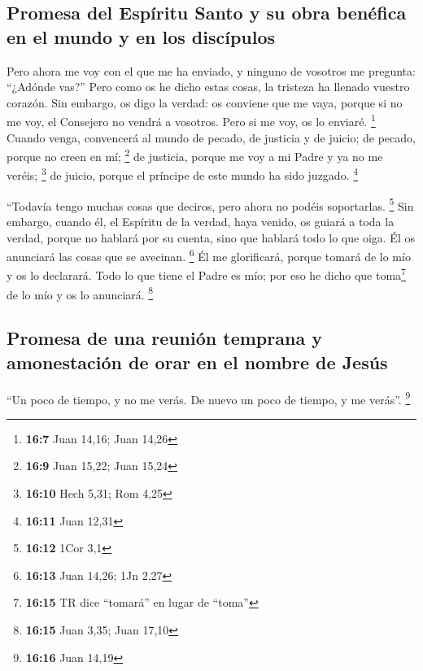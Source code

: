 \hypertarget{promesa-del-espuxedritu-santo-y-su-obra-benuxe9fica-en-el-mundo-y-en-los-discuxedpulos}{%
\subsection{Promesa del Espíritu Santo y su obra benéfica en el mundo y
en los
discípulos}\label{promesa-del-espuxedritu-santo-y-su-obra-benuxe9fica-en-el-mundo-y-en-los-discuxedpulos}}

 Pero ahora me voy con el que me ha enviado, y ninguno de
vosotros me pregunta: ``¿Adónde vas?''  Pero como os he
dicho estas cosas, la tristeza ha llenado vuestro corazón.
 Sin embargo, os digo la verdad: os conviene que me vaya,
porque si no me voy, el Consejero no vendrá a vosotros. Pero si me voy,
os lo enviaré. \footnote{\textbf{16:7} Juan 14,16; Juan 14,26}
 Cuando venga, convencerá al mundo de pecado, de justicia
y de juicio;  de pecado, porque no creen en mí;
\footnote{\textbf{16:9} Juan 15,22; Juan 15,24}  de
justicia, porque me voy a mi Padre y ya no me veréis; \footnote{\textbf{16:10}
  Hech 5,31; Rom 4,25}  de juicio, porque el príncipe de
este mundo ha sido juzgado. \footnote{\textbf{16:11} Juan 12,31}

 ``Todavía tengo muchas cosas que deciros, pero ahora no
podéis soportarlas. \footnote{\textbf{16:12} 1Cor 3,1} 
Sin embargo, cuando él, el Espíritu de la verdad, haya venido, os guiará
a toda la verdad, porque no hablará por su cuenta, sino que hablará todo
lo que oiga. Él os anunciará las cosas que se avecinan. \footnote{\textbf{16:13}
  Juan 14,26; 1Jn 2,27}  Él me glorificará, porque tomará
de lo mío y os lo declarará.  Todo lo que tiene el Padre
es mío; por eso he dicho que toma\footnote{\textbf{16:15} TR dice
  ``tomará'' en lugar de ``toma''} de lo mío y os lo anunciará.
\footnote{\textbf{16:15} Juan 3,35; Juan 17,10}

\hypertarget{promesa-de-una-reuniuxf3n-temprana-y-amonestaciuxf3n-de-orar-en-el-nombre-de-jesuxfas}{%
\subsection{Promesa de una reunión temprana y amonestación de orar en el
nombre de
Jesús}\label{promesa-de-una-reuniuxf3n-temprana-y-amonestaciuxf3n-de-orar-en-el-nombre-de-jesuxfas}}

 ``Un poco de tiempo, y no me verás. De nuevo un poco de
tiempo, y me verás''. \footnote{\textbf{16:16} Juan 14,19}

